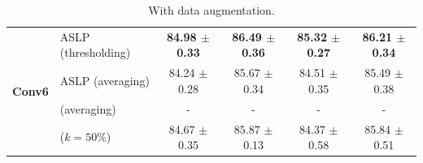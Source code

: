 \begin{table}[htbp]
\begin{subtable}[t]{\textwidth}
{\begin{tabular}{llcccc}
        \midrule
        \multirow{4}{*}{\textbf{Conv6}}                    & \ac{ASLP} (thresholding)                              & \textbf{84.98 $\pm$ 0.33} & \textbf{86.49 $\pm$ 0.36} & \textbf{85.32 $\pm$ 0.27} & \textbf{86.21 $\pm$ 0.34} \\
                                                           & \ac{ASLP} (averaging)                                 & 84.24 $\pm$ 0.28          & 85.67 $\pm$ 0.34          & 84.51 $\pm$ 0.35          & 85.49 $\pm$ 0.38          \\
                                                           & \cite{DBLP:conf/nips/ZhouLLY19} (averaging)      & -                         & -                         & -                         & -                         \\
                                                           & \cite{DBLP:conf/cvpr/RamanujanWKFR20} ($k=50\%$) & 84.67 $\pm$ 0.35          & 85.87 $\pm$ 0.13          & 84.37 $\pm$ 0.58          & 85.84 $\pm$ 0.51          \\
        \bottomrule
      \end{tabular}
    }
    \caption{With data augmentation.}
    \label{tab:chap2:perf-tables:with-augmentation}
  \end{subtable}

  \bigskip


\end{table}

